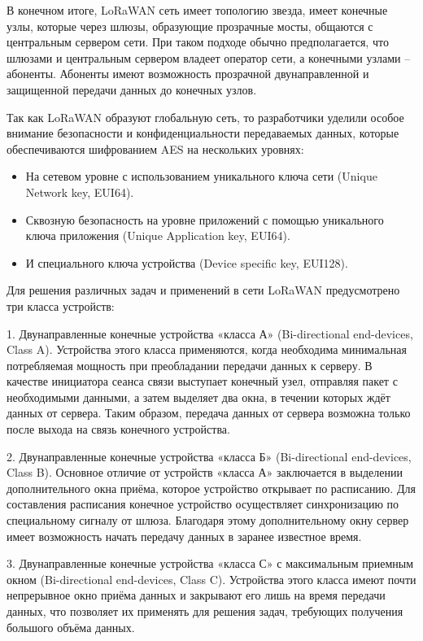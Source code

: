 В конечном итоге, LoRaWAN сеть имеет топологию звезда, имеет конечные узлы, которые через шлюзы, образующие прозрачные мосты, общаются с центральным сервером сети. При таком подходе обычно предполагается, что шлюзами и центральным сервером владеет оператор сети, а конечными узлами – абоненты. Абоненты имеют возможность прозрачной двунаправленной и защищенной передачи данных до конечных узлов.

Так как LoRaWAN образуют глобальную сеть, то разработчики уделили особое внимание безопасности и конфиденциальности передаваемых данных, которые обеспечиваются шифрованием AES на нескольких уровнях:



\begin{itemize}
	\item На сетевом уровне с использованием уникального ключа сети (Unique Network key, EUI64).
	\item Сквозную безопасность на уровне приложений с помощью уникального ключа приложения (Unique Application key, EUI64).
	\item И специального ключа устройства (Device specific key, EUI128).
\end{itemize}

Для решения различных задач и применений в сети LoRaWAN предусмотрено три класса устройств:

1. Двунаправленные конечные устройства «класса А» (Bi-directional end-devices, Class A). Устройства этого класса применяются, когда необходима минимальная потребляемая мощность при преобладании передачи данных к серверу. В качестве инициатора сеанса связи выступает конечный узел, отправляя пакет с необходимыми данными, а затем выделяет два окна, в течении которых ждёт данных от сервера. Таким образом, передача данных от сервера возможна только после выхода на связь конечного устройства.

2. Двунаправленные конечные устройства «класса Б» (Bi-directional end-devices, Class B). Основное отличие от устройств «класса А» заключается в выделении дополнительного окна приёма, которое устройство открывает по расписанию. Для составления расписания конечное устройство осуществляет синхронизацию по специальному сигналу от шлюза. Благодаря этому дополнительному окну сервер имеет возможность начать передачу данных в заранее известное время.

3. Двунаправленные конечные устройства «класса С» с максимальным приемным окном (Bi-directional end-devices, Class C). Устройства этого класса имеют почти непрерывное окно приёма данных и закрывают его лишь на время передачи данных, что позволяет их применять для решения задач, требующих получения большого объёма данных.

